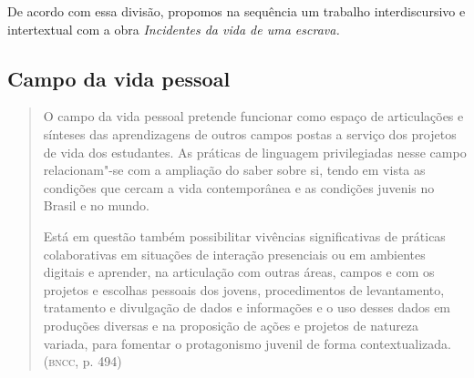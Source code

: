 \documentclass[12pt]{extarticle}
\begin{document}
De acordo com essa divisão, propomos na sequência um trabalho
interdiscursivo e intertextual com a obra \emph{Incidentes da vida de uma escrava.}

\subsection{Campo da vida pessoal}

\begin{quote}
O campo da vida pessoal pretende funcionar como espaço de articulações
e sínteses das aprendizagens de outros campos postas a serviço dos
projetos de vida dos estudantes. As práticas de linguagem privilegiadas
nesse campo relacionam"-se com a ampliação do saber sobre si, tendo em
vista as condições que cercam a vida contemporânea e as condições
juvenis no Brasil e no mundo.

Está em questão também possibilitar vivências significativas de práticas
colaborativas em situações de interação presenciais ou em ambientes
digitais e aprender, na articulação com outras áreas, campos e com os
projetos e escolhas pessoais dos jovens, procedimentos de levantamento,
tratamento e divulgação de dados e informações e o uso desses dados em
produções diversas e na proposição de ações e projetos de natureza
variada, para fomentar o protagonismo juvenil de forma
contextualizada. (\textsc{bncc}, p. 494)
\end{quote}
\end{document}
